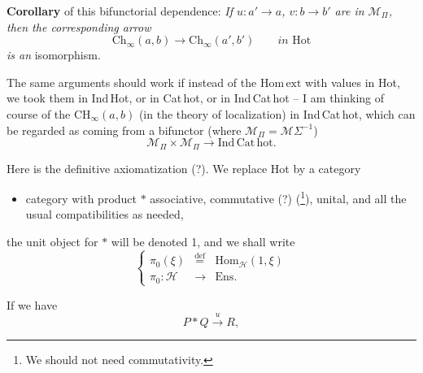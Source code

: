 \documentclass[11pt]{article}
\newcommand{\msp}[1]{\marginpar{\footnotesize [#1]}}
\newcommand{\Ch}{\mathrm{Ch}}
\newcommand{\Hot}{\mathrm{Hot}}
\newcommand{\Hom}{\mathrm{Hom}}
\begin{document}
\textbf{Corollary} of this bifunctorial dependence: \textit{If $u : a' \longrightarrow a$, $v : b \longrightarrow b'$ are in $\mathcal{M}_\Pi$, then the corresponding arrow}
\[
\Ch_\infty(a,b) \longrightarrow \Ch_\infty(a',b') \qquad \textit{in } \Hot
\]
\textit{is an} isomorphism.

The same arguments should work if instead of the $\Hom\,\mathrm{ext}$ with values in Hot, we took them in Ind\,Hot, or in Cat\,hot, or in Ind\,Cat\,hot -- I am thinking of course of the $\mathrm{CH}_\infty(a,b)$ (in the theory of localization) in Ind\,Cat\,hot, which can be regarded as coming from a bifunctor (where $\mathcal{M}_\Pi = \mathcal{M}\Sigma^{-1}$)
\[
\mathcal{M}_\Pi \times \mathcal{M}_\Pi \longrightarrow \mathrm{Ind}\,\mathrm{Cat}\,\mathrm{hot}.
\]

\msp{page 5}
Here is the definitive axiomatization (?). We replace Hot by a category

\begin{itemize}[label={$\mathcal{H}$,}]
\item category with product $*$ associative, commutative (?) (\footnote{We should not need commutativity.}), unital, and all the usual compatibilities as needed,
\end{itemize}

the unit object for $*$ will be denoted 1, and we shall write
\[
\left\{
\begin{array}{ccc}
\pi_0(\xi) & \overset{\text{def}}{=} & \Hom_{\mathcal{H}}(1,\xi) \\[1ex]
\pi_0 : \mathcal{H} & \longrightarrow & \mathrm{Ens}.
\end{array}
\right.
\]

If we have
\[
P * Q \xrightarrow{\ u\ } R,
\]
\end{document}
